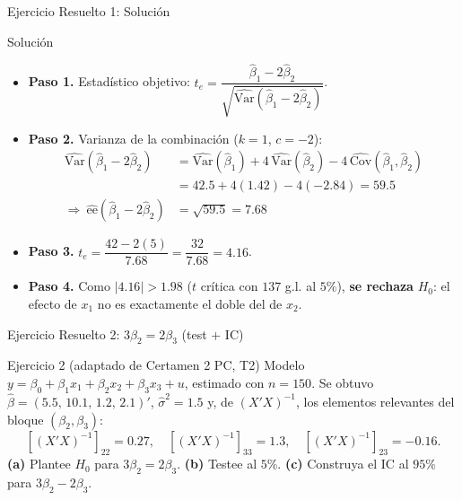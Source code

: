 \documentclass{beamer}
\begin{document}
\begin{frame}{Ejercicio Resuelto 1: Solución}
\begin{exampleblock}{Solución}
   \begin{itemize}
      \item \textbf{Paso 1.} Estadístico objetivo: $t_e = \dfrac{\hat{\beta}_1 - 2\hat{\beta}_2}{\sqrt{\hat{\text{Var}}(\hat{\beta}_1 - 2\hat{\beta}_2)}}$.
      \item \textbf{Paso 2.} Varianza de la combinación ($k=1$, $c=-2$):
            \begin{align*}
               \hat{\text{Var}}(\hat{\beta}_1 - 2\hat{\beta}_2) &= \hat{\text{Var}}(\hat{\beta}_1) + 4\,\hat{\text{Var}}(\hat{\beta}_2) - 4\,\hat{\text{Cov}}(\hat{\beta}_1, \hat{\beta}_2)\\
               &= 42{.}5 + 4(1{.}42) - 4(-2{.}84) = 59{.}5\\
                \Rightarrow\ \widehat{\text{ee}}(\hat{\beta}_1 - 2\hat{\beta}_2) &= \sqrt{59{.}5} = 7{.}68
            \end{align*}
        \item \textbf{Paso 3.} $t_e = \dfrac{42 - 2(5)}{7{.}68} = \dfrac{32}{7{.}68} = 4{.}16$.
        \item \textbf{Paso 4.} Como $|4{.}16| > 1{.}98$ ($t$ crítica con $137$ g.l. al $5\%$), \textbf{se rechaza} $H_0$: el efecto de $x_1$ no es exactamente el doble del de $x_2$.
   \end{itemize}
\end{exampleblock}
\end{frame}

\begin{frame}{Ejercicio Resuelto 2: $3\beta_2=2\beta_3$ (test + IC)}
\begin{block}{Ejercicio 2 (adaptado de Certamen 2 PC, T2)}
Modelo $y=\beta_0+\beta_1 x_1+\beta_2 x_2+\beta_3 x_3+u$, estimado con $n=150$. Se obtuvo $\hat{\beta}=(5{.}5,\,10{.}1,\,1{.}2,\,2{.}1)'$, $\hat{\sigma}^2=1{.}5$ y, de $(X'X)^{-1}$, los elementos relevantes del bloque $(\beta_2,\beta_3)$:
\[
[(X'X)^{-1}]_{22}=0{.}27,\quad [(X'X)^{-1}]_{33}=1{.}3,\quad [(X'X)^{-1}]_{23}=-0{.}16.
\]
\textbf{(a)} Plantee $H_0$ para $3\beta_2=2\beta_3$. \textbf{(b)} Testee al $5\%$. \textbf{(c)} Construya el IC al $95\%$ para $3\beta_2-2\beta_3$.
\end{block}
\end{frame}
\end{document}
